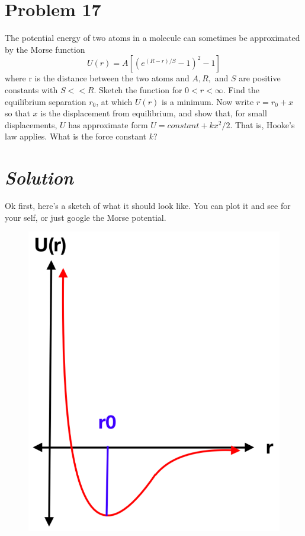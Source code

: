 \documentclass{article}
\begin{document}
\section*{Problem 17} 
The potential energy of two atoms in a molecule can sometimes be approximated by the Morse function
\[ U(r) = A\left[ (e^{(R-r)/S} - 1)^2 - 1 \right] \]
where r is the distance between the two atoms and $A, R,$ and $S$ are positive constants with $S<<R$. Sketch the function for $0<r<\infty$. Find the equilibrium separation $r_0$, at which $U(r)$ is a minimum. Now write $r = r_0 + x$ so that $x$ is the displacement from equilibrium, and show that, for small displacements, $U$ has approximate form $U = constant + kx^2/2$. That is, Hooke's law applies. What is the force constant $k$?
\section*{\textit{Solution}} 
Ok first, here's a sketch of what it should look like. You can plot it and see for your self, or just google the Morse potential.
\begin{figure}[h]
	\includegraphics[scale=0.20]{P17}
	\centering
\end{figure}
\end{document}
